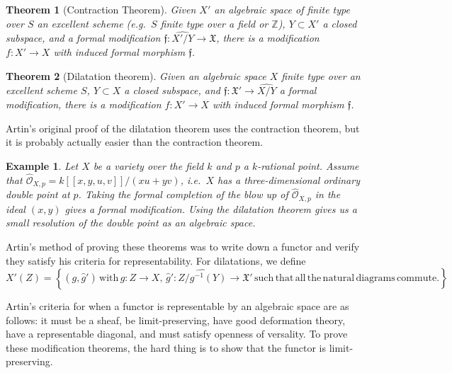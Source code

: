 \documentclass{amsart}
\newtheorem*{thm}{Theorem}
\newtheorem*{ex}{Example}
\newcommand{\X}{\mathfrak{X}\xspace}
\newcommand{\f}{\mathfrak{f}\xspace}
\begin{document}
\begin{thm}[Contraction Theorem]
Given $X'$ an algebraic space of finite type over $S$ an excellent scheme (e.g.~$S$ finite type over a field or $\mathbb{Z}$), $Y \subset X'$ a closed subspace, and a formal modification $\f:\widehat{X'/Y} \to \X$, there is a modification $f:X' \to X$ with induced formal morphism $\f$.
\end{thm}

\begin{thm}[Dilatation theorem]
Given an algebraic space $X$ finite type over an excellent scheme $S$, $Y \subset X$ a closed subspace, and $\f: \X' \to \widehat{X/Y}$ a formal modification, there is a modification $f:X' \to X$ with induced formal morphism $\f$.
\end{thm}

Artin's original proof of the dilatation theorem uses the contraction theorem, but it is probably actually easier than the contraction theorem.

\begin{ex}

Let $X$ be a variety over the field $k$ and $p$ a $k$-rational point. Assume that $\widehat{\mathcal{O}}_{X,p}=k[[x,y,u,v]]/(xu+yv)$, i.e.~$X$ has a three-dimensional ordinary double point at $p$. Taking the formal completion of the blow up of $\widehat{\mathcal{O}}_{X,p}$ in the ideal $(x,y)$ gives a formal modification. Using the dilatation theorem gives us a small resolution of the double point as an algebraic space.

\end{ex}

Artin's method of proving these theorems was to write down a functor and verify they satisfy his criteria for representability. For dilatations, we define \[X'(Z)=\left \{ (g,\widehat{g}')\mathrm{\,with\,}g:Z \to X,\,\hat{g}':\widehat{Z/g^{-1}(Y)} \to \X'\mathrm{\,such\, that\, all\, the\, natural\, diagrams\, commute.} \right \}\]

Artin's criteria for when a functor is representable by an algebraic space are as follows: it must be a sheaf, be limit-preserving, have good deformation theory, have a representable diagonal, and must satisfy openness of versality. To prove these modification theorems, the hard thing is to show that the functor is limit-preserving.
\end{document}
